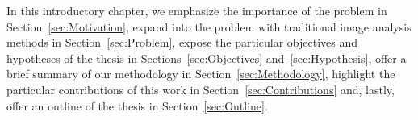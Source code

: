 In this introductory chapter, we emphasize the importance of the problem in Section~\ref{sec:Motivation}, expand into the problem with traditional image analysis methods in Section~\ref{sec:Problem}, expose the particular objectives and hypotheses of the thesis in Sections~\ref{sec:Objectives} and~\ref{sec:Hypothesis}, offer a brief summary of our methodology in Section~\ref{sec:Methodology}, highlight the particular contributions of this work in Section~\ref{sec:Contributions} and, lastly, offer an outline of the thesis in Section~\ref{sec:Outline}.
